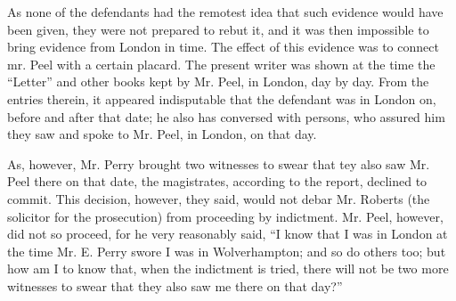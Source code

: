 As none of the defendants had the remotest idea that such evidence
would have been given, they were not prepared to rebut it, and it was
then impossible to bring evidence from London in time. The effect of
this evidence was to connect mr. Peel with a certain placard. The
present writer was shown at the time the ``Letter'' and other books
kept by Mr. Peel, in London, day by day. From the entries therein, it
appeared indisputable that the defendant was in London on, before and
after that date; he also has conversed with persons, who assured him
they saw and spoke to Mr. Peel, in London, on that day.

As, however, Mr. Perry brought two witnesses to swear that tey also saw
Mr. Peel there on that date, the magistrates, according to the report,
declined to commit. This decision, however, they said, would not debar
Mr. Roberts (the solicitor for the prosecution) from proceeding by
indictment. Mr. Peel, however, did not so proceed, for he very
reasonably said, ``I know that I was in London at the time Mr. E. Perry
swore I was in Wolverhampton; and so do others too; but how am I to know
that, when the indictment is tried, there will not be two more witnesses
to swear that they also saw me there on that day?''

